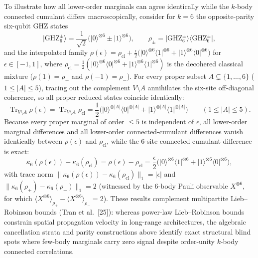\documentclass[
  11pt,
]{article}
\begin{document}
To illustrate how all lower-order marginals can agree identically while the \(k\)-body connected cumulant differs macroscopically, consider for \(k=6\) the opposite-parity six-qubit GHZ states
\[
\lvert\mathrm{GHZ}_6^\pm\rangle = \frac{1}{\sqrt{2}}\bigl(\lvert 0\rangle^{\otimes 6} \pm \lvert 1\rangle^{\otimes 6}\bigr), \qquad \rho_\pm = \lvert\mathrm{GHZ}_6^\pm\rangle\langle\mathrm{GHZ}_6^\pm\rvert,
\]
and the interpolated family \(\rho(\epsilon) = \rho_{\mathrm{cl}} + \frac{\epsilon}{2}\bigl(\lvert 0\rangle^{\otimes 6}\langle 1\rvert^{\otimes 6} + \lvert 1\rangle^{\otimes 6}\langle 0\rvert^{\otimes 6}\bigr)\) for \(\epsilon\in[-1,1]\), where \(\rho_{\mathrm{cl}} = \frac{1}{2}(\lvert 0\rangle^{\otimes 6}\langle 0\rvert^{\otimes 6} + \lvert 1\rangle^{\otimes 6}\langle 1\rvert^{\otimes 6})\) is the decohered classical mixture (\(\rho(1)=\rho_+\) and \(\rho(-1)=\rho_-\)). For every proper subset \(A \subsetneq \{1,\dots,6\}\) (\(1 \le |A| \le 5\)), tracing out the complement \(V\setminus A\) annihilates the six-site off-diagonal coherence, so all proper reduced states coincide identically:
\[
\operatorname{Tr}_{V\setminus A}\rho(\epsilon) = \operatorname{Tr}_{V\setminus A}\rho_{\mathrm{cl}} = \frac{1}{2}\bigl(\lvert 0\rangle^{\otimes |A|}\langle 0\rvert^{\otimes |A|} + \lvert 1\rangle^{\otimes |A|}\langle 1\rvert^{\otimes |A|}\bigr) \qquad (1 \le |A| \le 5).
\]
Because every proper marginal of order \(\le 5\) is independent of \(\epsilon\), all lower-order marginal differences and all lower-order connected-cumulant differences vanish identically between \(\rho(\epsilon)\) and \(\rho_{\mathrm{cl}}\), while the 6-site connected cumulant difference is exact:
\[
\kappa_6(\rho(\epsilon)) - \kappa_6(\rho_{\mathrm{cl}}) = \rho(\epsilon) - \rho_{\mathrm{cl}} = \frac{\epsilon}{2}\bigl(\lvert 0\rangle^{\otimes 6}\langle 1\rvert^{\otimes 6} + \lvert 1\rangle^{\otimes 6}\langle 0\rvert^{\otimes 6}\bigr),
\]
with trace norm \(\lVert\kappa_6(\rho(\epsilon)) - \kappa_6(\rho_{\mathrm{cl}})\rVert_1 = |\epsilon|\) and \(\lVert\kappa_6(\rho_+) - \kappa_6(\rho_-)\rVert_1 = 2\) (witnessed by the 6-body Pauli observable \(X^{\otimes 6}\), for which \(\langle X^{\otimes 6}\rangle_{\rho_+} - \langle X^{\otimes 6}\rangle_{\rho_-} = 2\)).
These results complement multipartite Lieb--Robinson bounds (Tran et al.~{[}25{]}): whereas power-law Lieb--Robinson bounds constrain spatial propagation velocity in long-range architectures, the algebraic cancellation strata and parity constructions above identify exact structural blind spots where few-body marginals carry zero signal despite order-unity \(k\)-body connected correlations.
\end{document}
